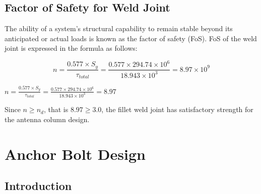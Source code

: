 {\subsection{Factor of Safety for Weld Joint }
The ability of a system's structural capability to remain stable beyond its anticipated or actual loads is known as the factor of safety (FoS). FoS of the weld joint is expressed in the formula as follows:

\begin{equation}
n=\frac{0.577\times S_y}{\tau_{total}} = \frac{0.577\times294.74\times{10}^6}{18.943\times{10}^3} = 8.97\times 10^9
\end{equation}

\(n=\frac{0.577\times S_y}{\tau_{total}} = \frac{0.577\times294.74\times{10}^6}{18.943\times{10}^3} = 8.97\)

Since \(n \geq n_d\), that is \(8.97 \geq 3.0\), the fillet weld joint has satisfactory strength for the antenna column design.  















\section{Anchor Bolt Design}

\subsection{Introduction}

}
